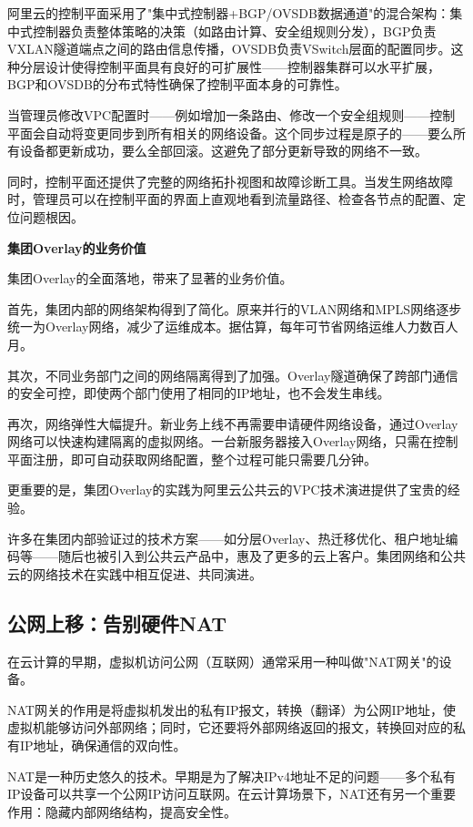 阿里云的控制平面采用了"集中式控制器+BGP/OVSDB数据通道"的混合架构：集中式控制器负责整体策略的决策（如路由计算、安全组规则分发），BGP负责VXLAN隧道端点之间的路由信息传播，OVSDB负责VSwitch层面的配置同步。这种分层设计使得控制平面具有良好的可扩展性——控制器集群可以水平扩展，BGP和OVSDB的分布式特性确保了控制平面本身的可靠性。

当管理员修改VPC配置时——例如增加一条路由、修改一个安全组规则——控制平面会自动将变更同步到所有相关的网络设备。这个同步过程是原子的——要么所有设备都更新成功，要么全部回滚。这避免了部分更新导致的网络不一致。

同时，控制平面还提供了完整的网络拓扑视图和故障诊断工具。当发生网络故障时，管理员可以在控制平面的界面上直观地看到流量路径、检查各节点的配置、定位问题根因。

\textbf{集团Overlay的业务价值}

集团Overlay的全面落地，带来了显著的业务价值。

首先，集团内部的网络架构得到了简化。原来并行的VLAN网络和MPLS网络逐步统一为Overlay网络，减少了运维成本。据估算，每年可节省网络运维人力数百人月。

其次，不同业务部门之间的网络隔离得到了加强。Overlay隧道确保了跨部门通信的安全可控，即使两个部门使用了相同的IP地址，也不会发生串线。

再次，网络弹性大幅提升。新业务上线不再需要申请硬件网络设备，通过Overlay网络可以快速构建隔离的虚拟网络。一台新服务器接入Overlay网络，只需在控制平面注册，即可自动获取网络配置，整个过程可能只需要几分钟。

更重要的是，集团Overlay的实践为阿里云公共云的VPC技术演进提供了宝贵的经验。

许多在集团内部验证过的技术方案——如分层Overlay、热迁移优化、租户地址编码等——随后也被引入到公共云产品中，惠及了更多的云上客户。集团网络和公共云的网络技术在实践中相互促进、共同演进。

\subsection{公网上移：告别硬件NAT}

在云计算的早期，虚拟机访问公网（互联网）通常采用一种叫做"NAT网关"的设备。

NAT网关的作用是将虚拟机发出的私有IP报文，转换（翻译）为公网IP地址，使虚拟机能够访问外部网络；同时，它还要将外部网络返回的报文，转换回对应的私有IP地址，确保通信的双向性。

NAT是一种历史悠久的技术。早期是为了解决IPv4地址不足的问题——多个私有IP设备可以共享一个公网IP访问互联网。在云计算场景下，NAT还有另一个重要作用：隐藏内部网络结构，提高安全性。


